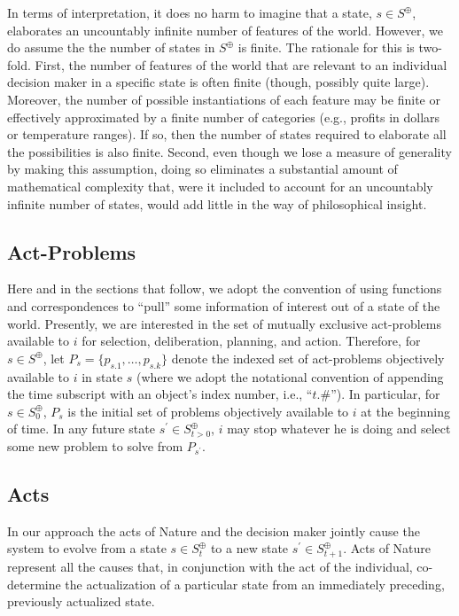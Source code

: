 \documentclass[
11pt,
titlepage,
reqno,
]{article}%
\theoremstyle{definition}
\begin{document}
In terms of interpretation, it does no harm to imagine that a state, $s\in S^\oplus$, elaborates an uncountably infinite number of features of the world.
However,  we do assume the the number of states in $S^\oplus$ is finite.
The rationale for this is two-fold.
First, the number of features of the world that are relevant to an individual decision maker in a specific state is often finite (though, possibly quite large).
Moreover, the number of possible instantiations of each feature may be finite or effectively approximated by a finite number of  categories (e.g., profits in dollars or temperature ranges).
If so, then the number of states required to elaborate all the possibilities is also finite.
Second, even  though we lose a measure of generality by making this assumption, doing so eliminates a substantial amount of mathematical complexity that, were it included to account for an uncountably infinite number of states, would add little in the way of philosophical insight.

\subsection{Act-Problems}\label{sec:problems}
Here and in the sections that follow, we adopt the convention of using functions and correspondences to ``pull'' some information of interest out of a state of the world. 
Presently, we are interested in the set of mutually exclusive act-problems available to $i$ for selection, deliberation, planning, and action.
Therefore, for $s\in S^\oplus$, let $P_s=\{p_{s.1},\ldots,p_{s.k}\}$ denote the indexed set of act-problems objectively available to $i$ in state $s$ (where we adopt the notational convention of appending the time subscript with an object's index number, i.e., ``$t.\#$'').
In particular, for $s\in S^\oplus_0$, $P_s$ is the initial set of problems objectively available to $i$ at the beginning of time. 
In any future state $s^\prime\in S^\oplus_{t>0}$,  $i$ may stop whatever he is doing and select some new problem to solve from $P_{s^\prime}$. 


\subsection{Acts}\label{sec:acts}

In our approach the acts of Nature and the decision maker jointly cause the system to evolve from a state $s\in S^\oplus_t$ to a new state $s^\prime\in S^\oplus_{t+1}$.
Acts of Nature represent all the causes that, in conjunction with the act of the individual, co-determine the actualization of a particular state from an immediately preceding, previously actualized state.
\end{document}
